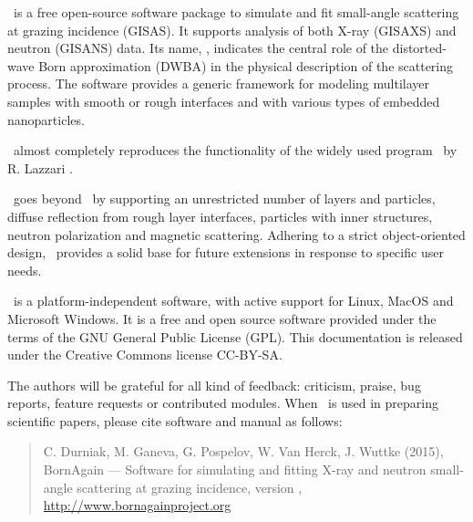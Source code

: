 \newpage
{}


\BornAgain\ is a free open-source software package to simulate and fit small-angle
scattering at grazing incidence (GISAS). 
It supports analysis of both  X-ray (GISAXS) and neutron (GISANS) data.
Its name, \BornAgain, indicates the central role of the distorted-wave Born
approximation (DWBA) in the physical description of the
scattering process. The software provides a generic framework for modeling multilayer samples with smooth or
rough interfaces and with various types of embedded nano\-particles.

\BornAgain\ almost completely reproduces the functionality
of the widely used program \IsGISAXS\
by R. Lazzari \cite{Laz02}.

\BornAgain\ goes beyond \IsGISAXS\ by
supporting an unrestricted number of layers and particles, 
diffuse reflection from rough layer interfaces,
particles with inner structures, neutron polarization and magnetic scattering.
Adhering to a strict object-oriented design,
\BornAgain\ provides a solid base for future extensions
in response to specific user needs.

\BornAgain\ is a platform-independent software,
with active support for Linux, MacOS and 
Microsoft Windows. 
It is a free and open source software provided under the terms
of the GNU General Public License (GPL).
This documentation is released under the Creative Commons license CC-BY-SA.

The authors will be grateful for all kind of
feedback: criticism, praise, bug reports, feature requests
or contributed modules.
When \BornAgain\ is used in preparing scientific papers,
please cite software and manual as follows: 
\begin{quote}
C. Durniak, M. Ganeva, G. Pospelov, W. Van Herck, J. Wuttke (2015),\newline
BornAgain --- Software for simulating and fitting
X-ray and neutron small-angle scattering at grazing incidence,
version \UserManualVersionNumber,\newline
\url{http://www.bornagainproject.org}
\end{quote}

